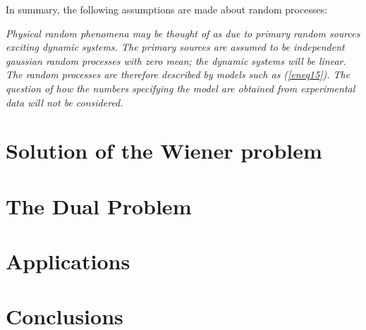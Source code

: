 \documentclass{article}
\begin{document}
In summary, the following assumptions are made about random processes:

\emph{Physical random phenomena may be thought of as due to primary random sources exciting dynamic systems. The primary sources are assumed to be independent gaussian random processes with zero mean; the dynamic systems will be linear. The random processes are therefore described by models such as (\ref{eneq15}). The question of how the numbers specifying the model are obtained from experimental data will not be considered.}
\section{Solution of the Wiener problem}
\section{The Dual Problem}
\section{Applications}
\section{Conclusions}
\end{document}
